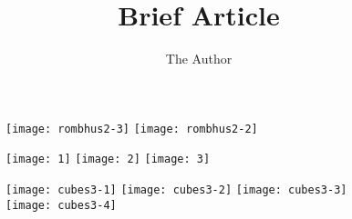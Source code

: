 \documentclass[11pt, oneside]{article}   	%
\title{Brief Article}
\author{The Author}
\begin{document}
\begin{figure}[htbp] %
   \centering
   \texttt{[image: rombhus2-3]}%
   \texttt{[image: rombhus2-2]} 
\end{figure}

\begin{figure}[htbp] %
   \centering
   \texttt{[image: 1]}%
   \texttt{[image: 2]}%
   \texttt{[image: 3]}%
\end{figure}

\begin{figure}[htbp] %
   \centering
   \texttt{[image: cubes3-1]}%
   \texttt{[image: cubes3-2]}%
   \texttt{[image: cubes3-3]}%
   \texttt{[image: cubes3-4]}%
\end{figure}
\end{document}
